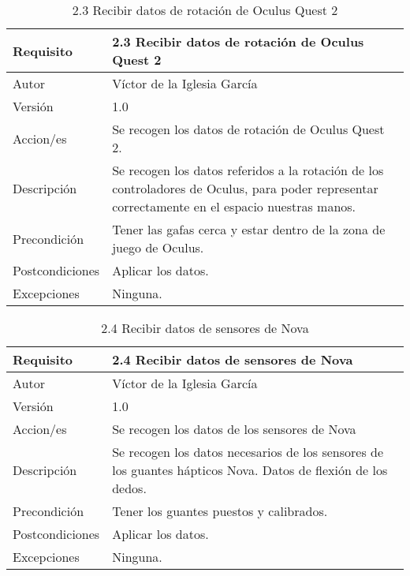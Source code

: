 \begin{table}[h]
    \centering
    \begin{tabular}{| m{3cm} | m{8.7cm} |}
    \hline
        Requisito & 2.3 Recibir datos de rotación de Oculus Quest 2\\ \hline
       Autor  &  Víctor de la Iglesia García \\ \hline
        Versión & 1.0 \\ \hline
        Accion/es & Se recogen los datos de rotación de Oculus Quest 2. \\ \hline
         Descripción & Se recogen los datos referidos a la rotación de los controladores de Oculus, para poder representar correctamente en el espacio nuestras manos. \\ \hline
        Precondición & Tener las gafas cerca y estar dentro de la zona de juego de Oculus. \\ \hline
        Postcondiciones & Aplicar los datos. \\ \hline
        Excepciones & Ninguna. \\ \hline
    \end{tabular}
    \caption{2.3 Recibir datos de rotación de Oculus Quest 2}
    \label{2.3 Recibir datos de rotación de Oculus Quest 2}
\end{table}

\newpage

\begin{table}[h]
    \centering
    \begin{tabular}{| m{3cm} | m{8cm} |}
    \hline
        Requisito & 2.4 Recibir datos de sensores de Nova\\ \hline
       Autor  &  Víctor de la Iglesia García \\ \hline
        Versión & 1.0 \\ \hline
        Accion/es & Se recogen los datos de los sensores de Nova \\ \hline
         Descripción & Se recogen los datos necesarios de los sensores de los guantes hápticos Nova. Datos de flexión de los dedos. \\ \hline
        Precondición & Tener los guantes puestos y calibrados. \\ \hline
        Postcondiciones & Aplicar los datos. \\ \hline
        Excepciones & Ninguna. \\ \hline
    \end{tabular}
    \caption{2.4 Recibir datos de sensores de Nova}
    \label{2.4 Recibir datos de sensores de Nova}
\end{table}


